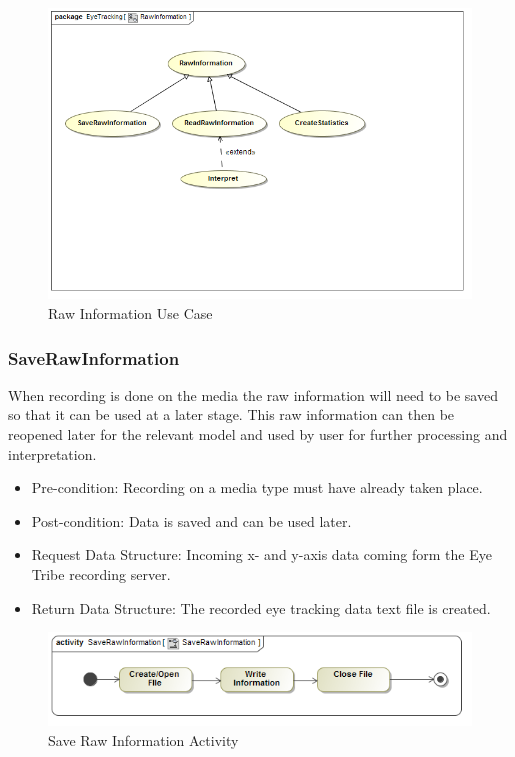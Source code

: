 \begin{figure}[!ht]
	\centering
	\includegraphics[scale=0.5,width=15cm,keepaspectratio]{Diagrams/Use_Case_Diagram__RawInformation.png}
	\caption{Raw Information Use Case}
\end{figure}
	
	\subsubsection{SaveRawInformation}
When recording is done on the media the raw information will need to be saved so that it can be used at a later stage. This raw information can then be reopened later for the relevant model and used by user for further processing and interpretation.
\begin{itemize}
\item Pre-condition: Recording on a media type must have already taken place.
\item Post-condition: Data is saved and can be used later.
\item Request Data Structure: Incoming x- and y-axis data coming form the Eye Tribe recording server.
\item Return Data Structure: The recorded eye tracking data text file is created.
\end{itemize}

\begin{figure}[!ht]
	\centering
	\includegraphics[scale=0.5,width=15cm,keepaspectratio]{Diagrams/Activity_Diagram__SaveRawInformation__SaveRawInformation.png}
	\caption{Save Raw Information Activity}
\end{figure}

